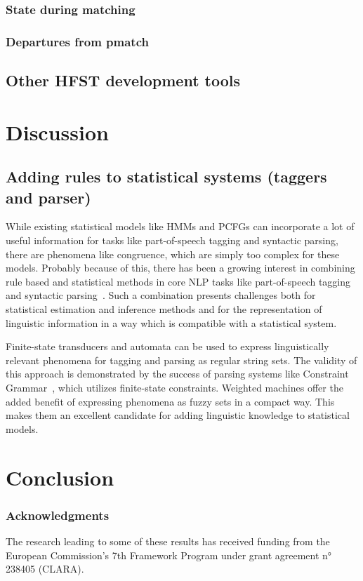 \documentclass{llncs}
\begin{document}
\subsubsection{State during matching}

\subsubsection{Departures from pmatch}

\subsection{Other HFST development tools}

\section{Discussion}\label{hfst:discussion}

\subsection{Adding rules to statistical systems (taggers and parser)}
While existing statistical models like HMMs and PCFGs can incorporate
a lot of useful information for tasks like part-of-speech tagging and
syntactic parsing, there are phenomena like congruence, which are
simply too complex for these models. Probably because of this, there
has been a growing interest in combining rule based and statistical
methods in core NLP tasks like part-of-speech tagging and syntactic
parsing~\cite{manning/2011}. Such a combination presents challenges
both for statistical estimation and inference methods and for the
representation of linguistic information in a way which is compatible
with a statistical system.

Finite-state transducers and automata can be used to express
linguistically relevant phenomena for tagging and parsing as regular
string sets. The validity of this approach is demonstrated by the
success of parsing systems like Constraint
Grammar~\cite{karlsson/1990}, which utilizes finite-state
constraints. Weighted machines offer the added benefit of expressing
phenomena as fuzzy sets in a compact way. This makes them an excellent
candidate for adding linguistic knowledge to statistical models.

\section{Conclusion}\label{hfst:conclusion}

\subsubsection*{Acknowledgments}
The research leading to some of these results has received funding from the
European Commission's 7th Framework Program under grant agreement n° 238405 (CLARA).




\end{document}
